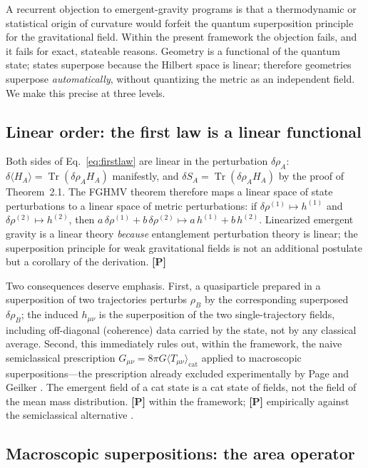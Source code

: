 \documentclass[11pt]{article}
\theoremstyle{definition}
\newcommand{\pP}{\textbf{[P]}}
\newcommand{\Tr}{\operatorname{Tr}}
\begin{document}
A recurrent objection to emergent-gravity programs is that a
thermodynamic or statistical origin of curvature would forfeit the quantum
superposition principle for the gravitational field. Within the present
framework the objection fails, and it fails for exact, stateable reasons.
Geometry is a functional of the quantum state; states superpose because the
Hilbert space is linear; therefore geometries superpose \emph{automatically},
without quantizing the metric as an independent field. We make this precise
at three levels.

\subsection{Linear order: the first law is a linear functional}

Both sides of Eq.~\eqref{eq:firstlaw} are linear in the perturbation
$\delta\rho_A$: $\delta\langle H_A\rangle=\Tr(\delta\rho_A H_A)$ manifestly,
and $\delta S_A=\Tr(\delta\rho_A H_A)$ by the proof of Theorem~2.1. The FGHMV
theorem therefore maps a linear space of state perturbations to a linear space
of metric perturbations: if $\delta\rho^{(1)}\mapsto h^{(1)}$ and
$\delta\rho^{(2)}\mapsto h^{(2)}$, then
$a\,\delta\rho^{(1)}+b\,\delta\rho^{(2)}\mapsto a\,h^{(1)}+b\,h^{(2)}$.
Linearized emergent gravity is a linear theory \emph{because} entanglement
perturbation theory is linear; the superposition principle for weak
gravitational fields is not an additional postulate but a corollary of the
derivation. \pP{}

Two consequences deserve emphasis. First, a quasiparticle prepared in a
superposition of two trajectories perturbs $\rho_B$ by the corresponding
superposed $\delta\rho_B$; the induced $h_{\mu\nu}$ is the superposition of
the two single-trajectory fields, including off-diagonal (coherence) data
carried by the state, not by any classical average. Second, this immediately
rules out, within the framework, the naive semiclassical prescription
$G_{\mu\nu}=8\pi G\langle T_{\mu\nu}\rangle_{\mathrm{cat}}$ applied to
macroscopic superpositions---the prescription already excluded experimentally
by Page and Geilker \cite{PageGeilker1981}. The emergent field of a cat state
is a cat state of fields, not the field of the mean mass distribution. \pP{}
within the framework; \pP{} empirically against the semiclassical alternative
\cite{PageGeilker1981}.

\subsection{Macroscopic superpositions: the area operator}
\end{document}
